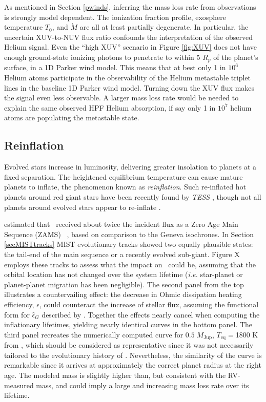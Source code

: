 \documentclass[twocolumn]{aastex631}
\newcommand{\hatp}{\object{HAT-P-67}~}
\newcommand{\hatpb}{\object{HAT-P-67 b}}
\begin{document}
As mentioned in Section \ref{pwinds}, inferring the mass loss rate from observations is strongly model dependent.  The ionization fraction profile, exosphere temperature $T_0$, and $\dot{M}$ are all at least partially degenerate.  In particular, the uncertain XUV-to-NUV flux ratio confounds the interpretation of the observed Helium signal.  Even the ``high XUV'' scenario in Figure \ref{fig:XUV} does not have enough ground-state ionizing photons to penetrate to within 5 $R_p$ of the planet's surface, in a 1D Parker wind model.  This means that at best only 1 in $10^{6}$ Helium atoms participate in the observability of the Helium metastable triplet lines in the baseline 1D Parker wind model.  Turning down the XUV flux makes the signal even less observable.  A larger mass loss rate would be needed to explain the same observed HPF Helium absorption, if say only 1 in $10^{7}$ helium atoms are populating the metastable state.


\subsection{Reinflation}
Evolved stars increase in luminosity, delivering greater insolation to planets at a fixed separation.  The heightened equilibrium temperature can cause mature planets to inflate, the phenomenon known as \emph{reinflation}.  Such re-inflated hot planets around red giant stars have been recently found by \emph{TESS} \citep{2022AJ....163..120G,2023arXiv230306728G}, though not all planets around evolved stars appear to re-inflate \citep{2022AJ....163...53S}.

\citet{2017AJ....153..211Z} estimated that \hatpb~received about twice the incident flux as a Zero Age Main Sequence (ZAMS) \hatp, based on comparison to the Geneva isochrones. In Section \ref{secMISTtracks} MIST evolutionary tracks showed two equally plausible states: the tail-end of the main sequence or a recently evolved sub-giant.  Figure X employs these tracks to assess what the impact on \hatpb~could be, assuming that the orbital location has not changed over the system lifetime (\emph{i.e.} star-planet or planet-planet migration has been negligible).  The second panel from the top illustrates a countervailing effect: the decrease in Ohmic dissipation heating efficiency, $\epsilon$, could counteract the increase of stellar flux, assuming the functional form for $\hat{\epsilon}_G$ described by \citet{2018AJ....155..214T}.  Together the effects nearly cancel when computing the inflationary lifetimes, yielding nearly identical curves in the bottom panel.  The third panel recreates the numerically computed curve for $0.5\;M_\mathrm{Jup}$, $T_\mathrm{eq}=$1800 K from \citep{2011ApJ...738....1B}, which should be considered as representative since it was not necessarily tailored to the evolutionary history of \hatpb.  Nevertheless, the similarity of the curve is remarkable since it arrives at approximately the correct planet radius at the right age.  The modeled mass is slightly higher than, but consistent with the RV-measured mass, and could imply a large and increasing mass loss rate over its lifetime.
\end{document}

